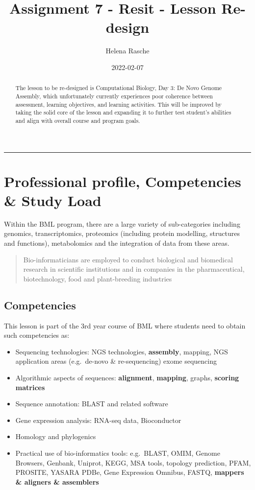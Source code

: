 \documentclass[paper=a4,justified,a4paper]{tufte-handout}
\title[A7 - Resit - Lesson Re-design]{Assignment 7 - Resit - Lesson Re-design}
\author{Helena Rasche}
\date{2022-02-07}
\providecommand{\tightlist}{%
  \setlength{\itemsep}{0pt}\setlength{\parskip}{0pt}}
\begin{document}
\maketitle
\begin{abstract}
The lesson to be re-designed is Computational Biology, Day 3: De Novo
Genome Assembly, which unfortunately currently experiences poor
coherence between assessment, learning objectives, and learning
activities. This will be improved by taking the solid core of the lesson
and expanding it to further test student's abilities and align with
overall course and program goals.
\end{abstract}
\noindent\rule{5in}{0.4pt}


\hypertarget{professional-profile-competencies-study-load}{%
\section{Professional profile, Competencies \& Study
Load}\label{professional-profile-competencies-study-load}}

Within the BML program, there are a large variety of sub-categories
including genomics, transcriptomics, proteomics (including protein
modelling, structures and functions), metabolomics and the integration
of data from these areas.

\begin{quote}
Bio-informaticians are employed to conduct biological and biomedical
research in scientific institutions and in companies in the
pharmaceutical, biotechnology, food and plant-breeding industries
\end{quote}

\hypertarget{competencies}{%
\subsection{Competencies}\label{competencies}}

This lesson is part of the 3rd year course of BML where students need to
obtain such competencies as:

\begin{itemize}
\tightlist
\item
  Sequencing technologies: NGS technologies, \textbf{assembly}, mapping,
  NGS application areas (e.g.~de-novo \& re-sequencing) exome sequencing
\item
  Algorithmic aspects of sequences: \textbf{alignment},
  \textbf{mapping}, graphs, \textbf{scoring matrices}
\item
  Sequence annotation: BLAST and related software
\item
  Gene expression analysis: RNA-seq data, Bioconductor
\item
  Homology and phylogenics
\item
  Practical use of bio-informatics tools: e.g.~BLAST, OMIM, Genome
  Browsers, Genbank, Uniprot, KEGG, MSA tools, topology prediction,
  PFAM, PROSITE, YASARA PDBe, Gene Expression Omnibus, FASTQ,
  \textbf{mappers \& aligners \& assemblers}
\end{itemize}
\end{document}
